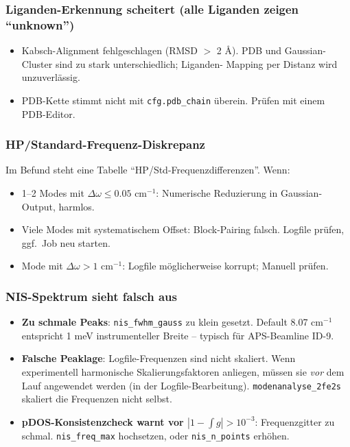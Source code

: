 \documentclass[11pt,a4paper,twoside]{article}
\theoremstyle{remark}
\begin{document}
\subsubsection*{Liganden-Erkennung scheitert (alle Liganden zeigen ``unknown'')}

\begin{itemize}
  \item Kabsch-Alignment fehlgeschlagen (RMSD $>$ 2 \AA{}). PDB und
        Gaussian-Cluster sind zu stark unterschiedlich; Liganden-
        Mapping per Distanz wird unzuverl\"assig.
  \item PDB-Kette stimmt nicht mit \texttt{cfg.pdb\_chain}
        \"uberein. Pr\"ufen mit einem PDB-Editor.
\end{itemize}

\subsubsection*{HP/Standard-Frequenz-Diskrepanz}

Im Befund steht eine Tabelle ``HP/Std-Frequenzdifferenzen''. Wenn:

\begin{itemize}
  \item 1--2 Modes mit $\Delta\omega \leq 0.05$ cm$^{-1}$:
        Numerische Reduzierung in Gaussian-Output, harmlos.
  \item Viele Modes mit systematischem Offset:
        Block-Pairing falsch. Logfile pr\"ufen, ggf.\ Job neu starten.
  \item Mode mit $\Delta\omega > 1$ cm$^{-1}$:
        Logfile m\"oglicherweise korrupt; Manuell pr\"ufen.
\end{itemize}

\subsubsection*{NIS-Spektrum sieht falsch aus}

\begin{itemize}
  \item \textbf{Zu schmale Peaks}: \texttt{nis\_fwhm\_gauss} zu klein
        gesetzt. Default 8.07 cm$^{-1}$ entspricht 1 meV instrumenteller
        Breite -- typisch f\"ur APS-Beamline ID-9.
  \item \textbf{Falsche Peaklage}: Logfile-Frequenzen sind nicht
        skaliert. Wenn experimentell harmonische Skalierungsfaktoren
        anliegen, m\"ussen sie \emph{vor} dem Lauf angewendet werden
        (in der Logfile-Bearbeitung). \texttt{modenanalyse\_2fe2s}
        skaliert die Frequenzen nicht selbst.
  \item \textbf{pDOS-Konsistenzcheck warnt vor $|1 - \int g|>10^{-3}$}:
        Frequenzgitter zu schmal. \texttt{nis\_freq\_max} hochsetzen,
        oder \texttt{nis\_n\_points} erh\"ohen.
\end{itemize}
\end{document}
